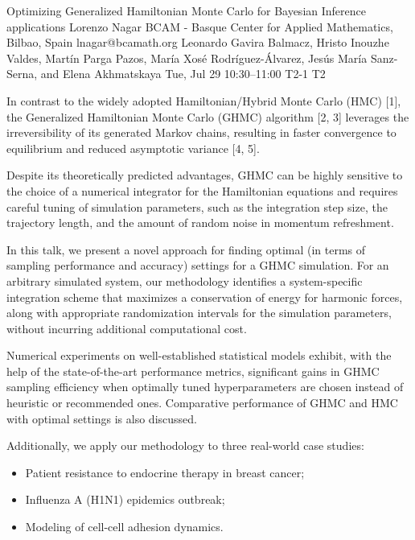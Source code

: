 \documentclass[12pt,lettersize,oneside]{book} %
\begin{document}
\begin{talk}
  {Optimizing Generalized Hamiltonian Monte Carlo for Bayesian Inference applications}%
  {Lorenzo Nagar}%
  {BCAM - Basque Center for Applied Mathematics, Bilbao, Spain}%
  {lnagar@bcamath.org}%
  {Leonardo Gavira Balmacz, Hristo Inouzhe Valdes, Mart\'in Parga Pazos, Mar\'ia Xos\'e Rodr\'iguez-\'Alvarez, Jes\'us Mar\'ia Sanz-Serna, and Elena Akhmatskaya}%
  {}%
  {Tue, Jul 29 10:30--11:00}%
  {T2-1}%
  {T2}%
  
    
   
In contrast to the widely adopted Hamiltonian/Hybrid Monte Carlo (HMC) [1], the Generalized Hamiltonian Monte Carlo (GHMC) algorithm [2, 3] leverages the irreversibility of its generated Markov chains, resulting in faster convergence to equilibrium and reduced asymptotic variance [4, 5]. 

Despite its theoretically predicted advantages, GHMC can be highly sensitive to the choice of a numerical integrator for the Hamiltonian equations and requires careful tuning of simulation parameters, such as the integration step size, the trajectory length, and the amount of random noise in momentum refreshment.

In this talk, we present a novel approach for finding optimal (in terms of sampling performance and accuracy) settings for a GHMC simulation. For an arbitrary simulated system, our methodology identifies a system-specific integration scheme that maximizes a conservation of energy for harmonic forces, along with appropriate randomization intervals for the simulation parameters, without incurring additional computational cost.

Numerical experiments on well-established statistical models exhibit, with the help of the state-of-the-art performance metrics, significant gains in GHMC sampling efficiency when optimally tuned hyperparameters are chosen instead of heuristic or recommended ones. Comparative performance of GHMC and HMC with optimal settings is also discussed. 

Additionally, we apply our methodology to three real-world case studies:
\begin{itemize}
\item Patient resistance to endocrine therapy in breast cancer;
\item Influenza A (H1N1) epidemics outbreak;
\item Modeling of cell-cell adhesion dynamics.
\end{itemize}


\end{talk}
\end{document}
